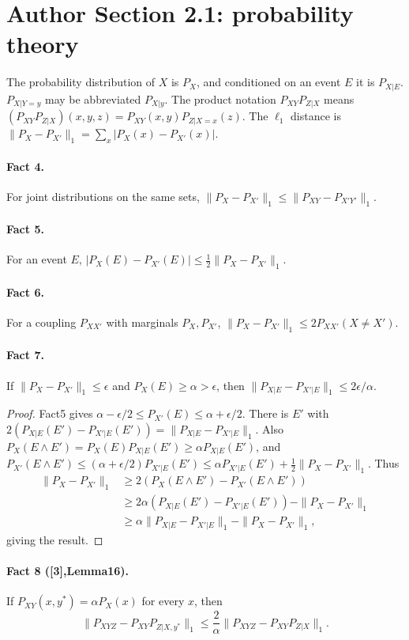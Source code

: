 \section*{Author Section 2.1: probability theory}
The probability distribution of $X$ is $P_X$, and conditioned on an event $E$ it is $P_{X|E}$. $P_{X|Y=y}$ may be abbreviated $P_{X|y}$. The product notation $P_{XY}P_{Z|X}$ means $(P_{XY}P_{Z|X})(x,y,z)=P_{XY}(x,y)P_{Z|X=x}(z)$. The $\ell_1$ distance is $\|P_X-P_{X'}\|_1=\sum_x|P_X(x)-P_{X'}(x)|$.
\paragraph{Fact 4.} For joint distributions on the same sets, $\|P_X-P_{X'}\|_1\le\|P_{XY}-P_{X'Y'}\|_1$.
\paragraph{Fact 5.} For an event $E$, $|P_X(E)-P_{X'}(E)|\le\frac12\|P_X-P_{X'}\|_1$.
\paragraph{Fact 6.} For a coupling $P_{XX'}$ with marginals $P_X,P_{X'}$, $\|P_X-P_{X'}\|_1\le2P_{XX'}(X\ne X')$.
\paragraph{Fact 7.} If $\|P_X-P_{X'}\|_1\le\epsilon$ and $P_X(E)\ge\alpha>\epsilon$, then $\|P_{X|E}-P_{X'|E}\|_1\le2\epsilon/\alpha$.
\begin{proof}Fact5 gives $\alpha-\epsilon/2\le P_{X'}(E)\le\alpha+\epsilon/2$. There is $E'$ with $2(P_{X|E}(E')-P_{X'|E}(E'))=\|P_{X|E}-P_{X'|E}\|_1$. Also $P_X(E\wedge E')=P_X(E)P_{X|E}(E')\ge\alpha P_{X|E}(E')$, and $P_{X'}(E\wedge E')\le(\alpha+\epsilon/2)P_{X'|E}(E')\le\alpha P_{X'|E}(E')+\frac12\|P_X-P_{X'}\|_1$. Thus
\begin{align*}\|P_X-P_{X'}\|_1&\ge2(P_X(E\wedge E')-P_{X'}(E\wedge E'))\\&\ge2\alpha(P_{X|E}(E')-P_{X'|E}(E'))-\|P_X-P_{X'}\|_1\\&\ge\alpha\|P_{X|E}-P_{X'|E}\|_1-\|P_X-P_{X'}\|_1,\end{align*}
giving the result.\end{proof}
\paragraph{Fact 8 ([3],Lemma16).} If $P_{XY}(x,y^*)=\alpha P_X(x)$ for every $x$, then
\[\|P_{XYZ}-P_{XY}P_{Z|X,y^*}\|_1\le\frac2\alpha\|P_{XYZ}-P_{XY}P_{Z|X}\|_1.\]
